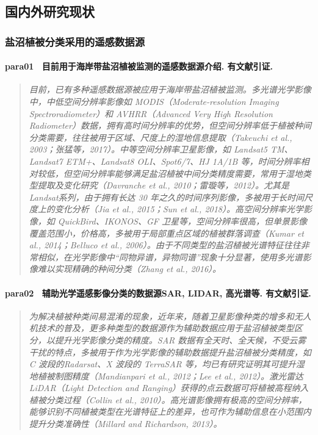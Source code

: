 \subsection{国内外研究现状}

\subsubsection{盐沼植被分类采用的遥感数据源}
\paragraph*{para01~
    \textcolor[RGB]{17, 205, 29}{目前用于海岸带盐沼植被监测的遥感数据源介绍. 有文献引证.}}
\begin{quotation}
    \itshape
    目前，已有多种遥感数据源被应用于海岸带盐沼植被监测。多光谱光学影像中，中低空间分辨率影像如 MODIS（Moderate-resolution Imaging Spectroradiometer）和 AVHRR（Advanced Very High Resolution Radiometer）数据，拥有高时间分辨率的优势，但空间分辨率低于植被种间分类需要，往往被用于区域、尺度上的湿地信息提取（Takeuchi et al., 2003；张猛等，2017）。中等空间分辨率卫星影像，如 Landsat5 TM、Landsat7 ETM+、Landsat8 OLI、Spot6/7、HJ 1A/1B 等，时间分辨率相对较低，但空间分辨率能够满足盐沼植被中间分类精度需要，常用于湿地类型提取及变化研究（Davranche et al., 2010；雷璇等，2012）。尤其是 Landsat系列，由于拥有长达 30 年之久的时间序列影像，多被用于长时间尺度上的变化分析（Jia et al., 2015；Sun et al., 2018）。高空间分辨率光学影像，如 QuickBird、IKONOS、GF 卫星等，空间分辨率很高，但单景影像覆盖范围小，价格高，多被用于局部重点区域的植被群落调查（Kumar et al., 2014；Belluco et al., 2006）。由于不同类型的盐沼植被光谱特征往往非常相似，在光学影像中“同物异谱，异物同谱”现象十分显著，使用多光谱影像难以实现精确的种间分类（Zhang et al., 2016）。 
\end{quotation}

\paragraph*{para02~
    \textcolor[RGB]{17, 205, 29}{辅助光学遥感影像分类的数据源SAR, LIDAR, 高光谱等. 有文献引证.}}
\begin{quotation}
    \itshape
    为解决植被种类间易混淆的现象，近年来，随着卫星影像种类的增多和无人机技术的普及，更多种类型的数据源作为辅助数据应用于盐沼植被类型区分，以提升光学影像分类的精度。SAR 数据有全天时、全天候，不受云雾干扰的特点，多被用于作为光学影像的辅助数据提升盐沼植被分类精度，如 C 波段的Radarsat、X 波段的 TerraSAR 等，均已有研究证明其可提升湿地植被制图精度（Mandianpari et al., 2012；Lee et al., 2012）。激光雷达 LiDAR（Light Detection and Ranging）获得的点云数据可将植被高程纳入植被分类过程（Collin et al., 2010）。高光谱影像拥有极高的空间分辨率，能够识别不同植被类型在光谱特征上的差异，也可作为辅助信息在小范围内提升分类准确性（Millard and Richardson, 2013）。 
\end{quotation}

